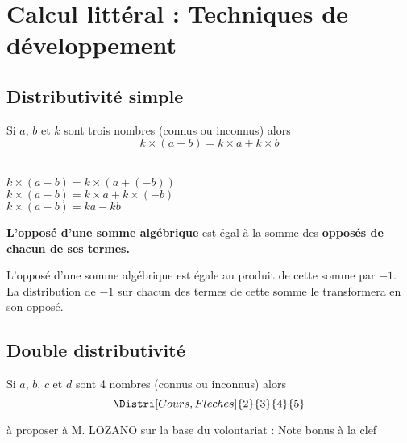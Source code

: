 \section{Calcul littéral : Techniques de développement}
\subsection{Distributivité simple}

\begin{propriete}[\admise]
    Si $a$, $b$ et $k$ sont trois nombres (connus ou inconnus) alors$$k\times(a+b)=k\times a+k\times b$$
\end{propriete}

\begin{remarque}
    \phantom{rrr}\\
    $k\times(a-b)=k\times(a+(-b))$\\
    $k\times(a-b)=k\times a+k\times (-b)$\\
    $k\times(a-b)=ka-kb$
\end{remarque}

\begin{propriete}
    {\bfseries L'opposé d'une somme algébrique} est égal à la somme des {\bfseries opposés de chacun de ses termes.}
\end{propriete}

\begin{preuve}
    L'opposé d'une somme algébrique est égale au produit de cette somme par $-1$.\\
    La distribution de $-1$ sur chacun des termes de cette somme le transformera en son opposé.
\end{preuve}

\subsection{Double distributivité}
\begin{propriete}[\admise]
    Si $a$, $b$, $c$ et $d$ sont 4 nombres (connus ou inconnus) alors $$ \Distri[Cours,Fleches]{2}{3}{4}{5}$$ 
\end{propriete}

\begin{preuve}
    à proposer à M. LOZANO sur la base du volontariat : Note bonus à la clef 
\end{preuve}

